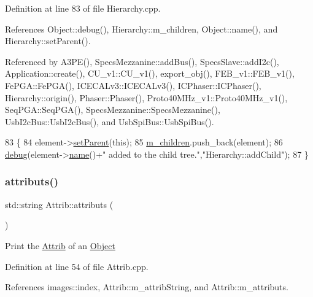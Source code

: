 Definition at line 83 of file Hierarchy.\+cpp.



References Object\+::debug(), Hierarchy\+::m\+\_\+children, Object\+::name(), and Hierarchy\+::set\+Parent().



Referenced by A3\+P\+E(), Specs\+Mezzanine\+::add\+Bus(), Specs\+Slave\+::add\+I2c(), Application\+::create(), C\+U\+\_\+v1\+::\+C\+U\+\_\+v1(), export\+\_\+obj(), F\+E\+B\+\_\+v1\+::\+F\+E\+B\+\_\+v1(), Fe\+P\+G\+A\+::\+Fe\+P\+G\+A(), I\+C\+E\+C\+A\+Lv3\+::\+I\+C\+E\+C\+A\+Lv3(), I\+C\+Phaser\+::\+I\+C\+Phaser(), Hierarchy\+::origin(), Phaser\+::\+Phaser(), Proto40\+M\+Hz\+\_\+v1\+::\+Proto40\+M\+Hz\+\_\+v1(), Seq\+P\+G\+A\+::\+Seq\+P\+G\+A(), Specs\+Mezzanine\+::\+Specs\+Mezzanine(), Usb\+I2c\+Bus\+::\+Usb\+I2c\+Bus(), and Usb\+Spi\+Bus\+::\+Usb\+Spi\+Bus().


\begin{DoxyCode}
83                                           \{
84   element->\hyperlink{classHierarchy_a585ad1aeec16077a0e532ab8b4fc557b}{setParent}(\textcolor{keyword}{this});
85   \hyperlink{classHierarchy_a038816763941fd4a930504917f60483b}{m\_children}.push\_back(element);
86   \hyperlink{classObject_aac010553f022165573714b7014a15f0d}{debug}(element->\hyperlink{classObject_a300f4c05dd468c7bb8b3c968868443c1}{name}()+\textcolor{stringliteral}{" added to the child tree."},\textcolor{stringliteral}{"Hierarchy::addChild"});
87 \}
\end{DoxyCode}
\mbox{\label{classAttrib_aee7bbf16b144887f196e1341b24f8a26}} 
\subsubsection{\texorpdfstring{attributs()}{attributs()}}
{\footnotesize\ttfamily std\+::string Attrib\+::attributs (\begin{DoxyParamCaption}{ }\end{DoxyParamCaption})\hspace{0.3cm}{\ttfamily [inherited]}}

Print the \hyperlink{classAttrib}{Attrib} of an \hyperlink{classObject}{Object} 

Definition at line 54 of file Attrib.\+cpp.



References images\+::index, Attrib\+::m\+\_\+attrib\+String, and Attrib\+::m\+\_\+attributs.



